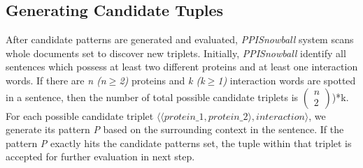 \subsection{Generating Candidate Tuples}
\label{GenTuples}

After candidate patterns are generated and evaluated, \emph{PPISnowball} system scans whole documents set to discover new triplets. Initially, \emph{PPISnowball} identify all sentences which possess at least two different proteins and at least one interaction words. If there are \emph{n (n$\geq$2)} proteins and \emph{k (k$\geq$1)} interaction words are spotted in a sentence, then the number of total possible candidate triplets is $\left(\begin{smallmatrix} n\\2 \end{smallmatrix} \right)$)*k. For each possible candidate triplet $\langle\langle protein\_1,protein\_2\rangle,interaction\rangle$, we generate its pattern \emph{P} based on the surrounding context in the sentence. If the pattern \emph{P} exactly hits the candidate patterns set, the tuple within that triplet is accepted for further evaluation in next step.

